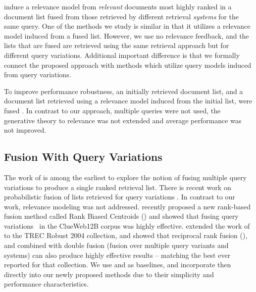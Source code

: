\citet{Rabinovich+al:14a} induce a relevance model from {\em
relevant} documents most highly ranked in a document list fused from
those retrieved by different retrieval {\em systems} for the same
query.
One of the methods we study is similar in that it utilizes a
relevance model induced from a fused list.
However, we use no relevance feedback, and the lists that are fused
are retrieved using the same retrieval approach but for different
query variations.
Additional important difference is that we formally connect the
proposed approach with methods which utilize query models induced
from query variations.

To improve performance robustness, an initially retrieved document
list, and a document list retrieved using a relevance model induced
from the initial list, were fused \cite{Zighelnic+Kurland:08a}.
In contrast to our approach, multiple queries were not used, the
generative theory to relevance was not extended and average
performance was not improved.


\subsection{Fusion With Query Variations}
The work of {\citet{bccc93-sigir,belkin1995combining}} is among the
earliest to explore the notion of fusing multiple query variations to
produce a single ranked retrieval list.
There is recent work on probabilistic fusion of lists retrieved for
query variations \cite{Rabiou+Carterette:16a}.
In contrast to our work, relevance modeling was not addressed.
{\citet{bailey2017retrieval}} recently proposed a new rank-based
fusion method called Rank Biased Centroids () and showed
that fusing query variations~{\cite{bailey2016uqv100}} in the
ClueWeb12B corpus was highly effective.
{\citet{bc17-adcs}} extended the work of \citet{bailey2017retrieval}
to the TREC Robust 2004 collection, and showed that reciprocal rank
fusion \cite{cormack2009reciprocal} (), and
{} \cite{fox1994combination}
combined with double fusion (fusion over multiple query variants and
systems) can also produce highly effective results -- matching the
best ever reported for that collection.
We use {} and {} as baselines, and
incorporate then directly into our newly proposed methods due to
their simplicity and performance characteristics.


\endinput


\subsection{Rank Fusion}
We now turn our attention to rank fusion as our approach conceptually
captures ideas from both relevance modeling and fusion.
There is a long history of fusing result lists from multiple ranking
models.
Rank fusion algorithms can broadly be classified into two
categories~{\citep{frank2005comparing}} -- score-based rank fusion
and rank-based fusion.
The earliest algorithms such as \method{CombSUM} and \method{CombMNZ}
are score-based~\cite{fox1994combination}.
\method{CombSUM} can be calculated as:

